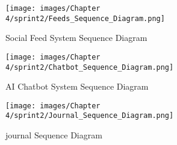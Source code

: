 \begin{figure}[H]
    \centering
    \texttt{[image: images/Chapter 4/sprint2/Feeds\_Sequence\_Diagram.png]}
    \caption{Social Feed System Sequence Diagram}
    \label{fig:feeds-sequence-diagram}
\end{figure}

\begin{figure}[H]
    \centering
    \texttt{[image: images/Chapter 4/sprint2/Chatbot\_Sequence\_Diagram.png]}
    \caption{AI Chatbot System Sequence Diagram}
    \label{fig:chatbot-sequence-diagram}
\end{figure}
\begin{figure}[H]
    \centering
    \texttt{[image: images/Chapter 4/sprint2/Journal\_Sequence\_Diagram.png]}
    \caption{journal Sequence Diagram}
    \label{fig:journaling-sequence-diagram}
\end{figure}
